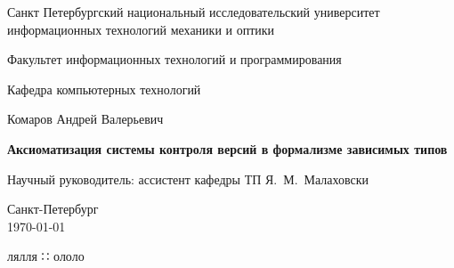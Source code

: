 \documentclass[a4paper]{report}
\theoremstyle{plain}
\theoremstyle{definition}
\begin{document}
\pagestyle{title}

\begin{center}
  Санкт Петербургский национальный исследовательский университет\\
  информационных технологий механики и оптики\\
  \hrulefill
 
\vspace{2cm}

Факультет информационных технологий и программирования

Кафедра компьютерных технологий

\vspace{3cm}

{\Large Комаров Андрей Валерьевич}

\vspace{2cm}

\vbox{\LARGE\bfseries Аксиоматизация системы контроля версий в
  формализме зависимых типов }

\vspace{4cm}

{\Large Научный руководитель: ассистент кафедры ТП Я.~М.~Малаховски}

\vspace{6cm}

Санкт-Петербург\\ \today
\end{center}


\newpage
\pagestyle{plain}

\tableofcontents

\startthechapters






лялля ∷ ололо

\printbibliography
\end{document}

